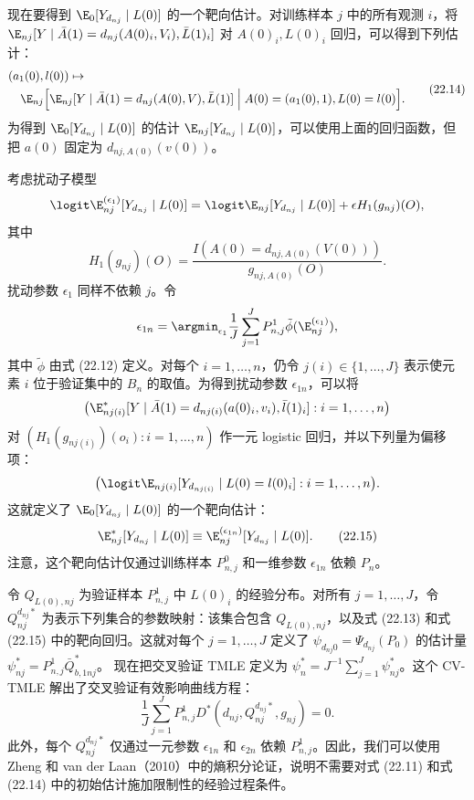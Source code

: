现在要得到 $\E_0[Y_{d_{nj}}\mid L(0)]$ 的一个靶向估计。对训练样本 $j$ 中的所有观测 $i$，将
$\E_{nj}[Y\mid\bar A(1)=d_{nj}(A(0)_i,V_i),\bar L(1)_i]$
对 $A(0)_i,L(0)_i$ 回归，可以得到下列估计：
\begin{equation}
\begin{aligned}
 &(a_1(0),l(0))\mapsto\\
 &\quad\E_{nj}\Bigl[\E_{nj}[Y\mid\bar A(1)=d_{nj}(A(0),V),\bar L(1)]
 \Bigm| A(0)=(a_1(0),1),L(0)=l(0)\Bigr].
\end{aligned}
\tag{22.14}
\end{equation}
为得到 $\E_0[Y_{d_{nj}}\mid L(0)]$ 的估计 $\E_{nj}[Y_{d_{nj}}\mid L(0)]$，可以使用上面的回归函数，但把 $a(0)$ 固定为 $d_{nj,A(0)}(v(0))$。

考虑扰动子模型
\[
 \logit\E_{nj}^{(\epsilon_1)}[Y_{d_{nj}}\mid L(0)]
 =\logit\E_{nj}[Y_{d_{nj}}\mid L(0)]+\epsilon H_1(g_{nj})(O),
\]
其中
\[
 H_1(g_{nj})(O)=\frac{I(A(0)=d_{nj,A(0)}(V(0)))}{g_{nj,A(0)}(O)}.
\]
扰动参数 $\epsilon_1$ 同样不依赖 $j$。令
\[
 \epsilon_{1n}=\argmin_{\epsilon_1}\frac1J\sum_{j=1}^JP_{n,j}^1
 \tilde\phi(\E_{nj}^{(\epsilon_1)}),
\]
其中 $\tilde\phi$ 由式 (22.12) 定义。对每个 $i=1,\ldots,n$，仍令 $j(i)\in\{1,\ldots,J\}$ 表示使元素 $i$ 位于验证集中的 $B_n$ 的取值。为得到扰动参数 $\epsilon_{1n}$，可以将
\[
 \bigl(\E_{nj(i)}^*[Y\mid\bar A(1)=d_{nj(i)}(a(0)_i,v_i),
 \bar l(1)_i]:i=1,\ldots,n\bigr)
\]
对 $(H_1(g_{nj(i)})(o_i):i=1,\ldots,n)$ 作一元 logistic 回归，并以下列量为偏移项：
\[
 \bigl(\logit\E_{nj(i)}[Y_{d_{nj(i)}}\mid L(0)=l(0)_i]:i=1,\ldots,n\bigr).
\]
这就定义了 $\E_0[Y_{d_{nj}}\mid L(0)]$ 的一个靶向估计：
\begin{equation}
 \E_{nj}^*[Y_{d_{nj}}\mid L(0)]
 \equiv\E_{nj}^{(\epsilon_{1n})}[Y_{d_{nj}}\mid L(0)].
\tag{22.15}
\end{equation}
注意，这个靶向估计仅通过训练样本 $P_{n,j}^0$ 和一维参数 $\epsilon_{1n}$ 依赖 $P_n$。

令 $Q_{L(0),nj}$ 为验证样本 $P_{n,j}^1$ 中 $L(0)_i$ 的经验分布。对所有 $j=1,\ldots,J$，令 $Q_{nj}^{d_{nj}*}$ 为表示下列集合的参数映射：该集合包含 $Q_{L(0),nj}$，以及式 (22.13) 和式 (22.15) 中的靶向回归。这就对每个 $j=1,\ldots,J$ 定义了 $\psi_{d_{nj}0}=\Psi_{d_{nj}}(P_0)$ 的估计量
$\psi_{nj}^*=P_{n,j}^1\bar Q_{b,1nj}^*$。
现在把交叉验证 TMLE 定义为 $\psi_n^*=J^{-1}\sum_{j=1}^J\psi_{nj}^*$。这个 CV-TMLE 解出了交叉验证有效影响曲线方程：
\[
 \frac1J\sum_{j=1}^JP_{n,j}^1D^*(d_{nj},Q_{nj}^{d_{nj}*},g_{nj})=0.
\]
此外，每个 $Q_{nj}^{d_{nj}*}$ 仅通过一元参数 $\epsilon_{1n}$ 和 $\epsilon_{2n}$ 依赖 $P_{n,j}^1$。因此，我们可以使用 Zheng 和 van der Laan（2010）中的熵积分论证，说明不需要对式 (22.11) 和式 (22.14) 中的初始估计施加限制性的经验过程条件。

